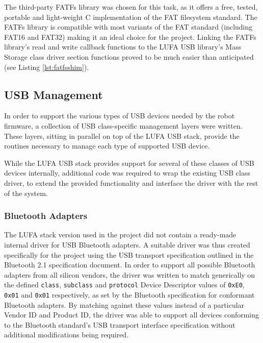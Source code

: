The third-party FATFs library was chosen for this task, as it offers a free, tested, portable and light-weight C implementation of the FAT filesystem standard. The FATFs library is compatible with most variants of the FAT standard (including FAT16 and FAT32) making it an ideal choice for the project. Linking the FATFs library's read and write callback functions to the LUFA USB library's Mass Storage class driver section functions proved to be much easier than anticipated (see Listing \ref{lst:fatfsshim}).



\FloatBarrier
\subsection{USB Management}

In order to support the various types of USB devices needed by the robot firmware, a collection of USB class-specific management layers were written. These layers, sitting in parallel on top of the LUFA USB stack, provide the routines necessary to manage each type of supported USB device.

While the LUFA USB stack provides support for several of these classes of USB devices internally, additional code was required to wrap the existing USB class driver, to extend the provided functionality and interface the driver with the rest of the system.

\FloatBarrier
\subsubsection{Bluetooth Adapters}

The LUFA stack version used in the project did not contain a ready-made internal driver for USB Bluetooth adapters. A suitable driver was thus created specifically for the project using the USB transport specification outlined in the Bluetooth 2.1 specification document. In order to support all possible Bluetooth adapters from all silicon vendors, the driver was written to match generically on the defined \texttt{class}, \texttt{subclass} and \texttt{protocol} Device Descriptor values of \texttt{0xE0}, \texttt{0x01} and \texttt{0x01} respectively, as set by the Bluetooth specification for conformant Bluetooth adapters. By matching against these values instead of a particular Vendor ID and Product ID, the driver was able to support all devices conforming to the Bluetooth standard's USB transport interface specification without additional modifications being required.

